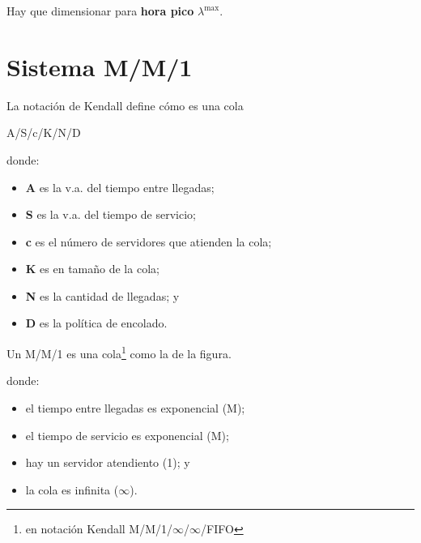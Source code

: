 \documentclass[xcolor={x11names}]{beamer}
\begin{document}
\begin{frame}{\secname}
    Hay que dimensionar para \textbf{hora pico}
    $\lambda^{\max}$.

    \vfill

    \begin{figure}
        
    \end{figure}
\end{frame}



\section{Sistema M/M/1}

\begin{frame}{\secname}
    La notación de Kendall define cómo es 
    una cola
    \begin{center}
        A/S/c/K/N/D 
    \end{center}
    donde:
    \begin{itemize}
        \item \textbf{A} es la v.a. del tiempo
            entre llegadas;
        \item \textbf{S} es la v.a. del tiempo
            de servicio;
        \item \textbf{c} es el número de
            servidores que atienden la cola;
        \item \textbf{K} es en tamaño de la cola;
        \item \textbf{N} es la cantidad de
            llegadas; y
        \item \textbf{D} es la política de
            encolado.
    \end{itemize}
\end{frame}




\begin{frame}{\secname}
    Un M/M/1 es una cola\footnote{en notación
    Kendall M/M/1/$\infty$/$\infty$/FIFO}
    como la de la figura.

    \begin{figure}
        
    \end{figure}

    donde:
    \begin{itemize}
        \item el tiempo entre llegadas es
            exponencial (M);
        \item el tiempo de servicio es
            exponencial (M);
        \item hay un servidor atendiento (1); y
        \item la cola es infinita ($\infty$).
    \end{itemize}

\end{frame}
\end{document}
